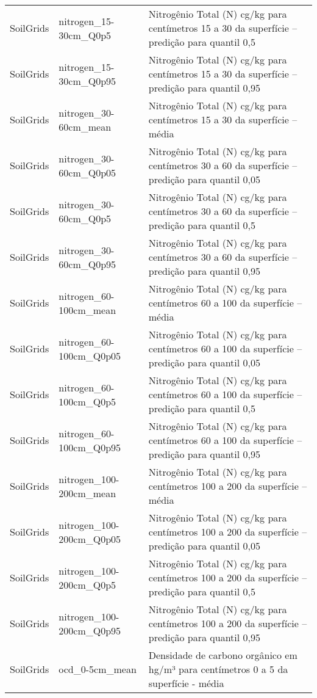 \begin{longtable}{@{} p{4cm} p{4cm} p{8cm} @{}}
	SoilGrids &
	nitrogen\_15-30cm\_Q0p5 &
	Nitrogênio Total (N) cg/kg  para centímetros 15 a 30 da superfície – predição para quantil 0,5 \\
	SoilGrids &
	nitrogen\_15-30cm\_Q0p95 &
	Nitrogênio Total (N) cg/kg  para centímetros 15 a 30 da superfície – predição para quantil 0,95 \\
	SoilGrids &
	nitrogen\_30-60cm\_mean &
	Nitrogênio Total (N) cg/kg  para centímetros 15 a 30 da superfície – média \\
	SoilGrids &
	nitrogen\_30-60cm\_Q0p05 &
	Nitrogênio Total (N) cg/kg  para centímetros 30 a 60 da superfície – predição para quantil 0,05 \\
	SoilGrids &
	nitrogen\_30-60cm\_Q0p5 &
	Nitrogênio Total (N) cg/kg  para centímetros 30 a 60 da superfície – predição para quantil 0,5 \\
	SoilGrids &
	nitrogen\_30-60cm\_Q0p95 &
	Nitrogênio Total (N) cg/kg  para centímetros 30 a 60 da superfície – predição para quantil 0,95 \\
	SoilGrids &
	nitrogen\_60-100cm\_mean &
	Nitrogênio Total (N) cg/kg  para centímetros 60 a 100 da superfície – média \\
	SoilGrids &
	nitrogen\_60-100cm\_Q0p05 &
	Nitrogênio Total (N) cg/kg  para centímetros 60 a 100 da superfície – predição para quantil 0,05 \\
	SoilGrids &
	nitrogen\_60-100cm\_Q0p5 &
	Nitrogênio Total (N) cg/kg  para centímetros 60 a 100 da superfície – predição para quantil 0,5 \\
	SoilGrids &
	nitrogen\_60-100cm\_Q0p95 &
	Nitrogênio Total (N) cg/kg  para centímetros 60 a 100 da superfície – predição para quantil 0,95 \\
	SoilGrids &
	nitrogen\_100-200cm\_mean &
	Nitrogênio Total (N) cg/kg  para centímetros 100 a 200 da superfície – média \\
	SoilGrids &
	nitrogen\_100-200cm\_Q0p05 &
	Nitrogênio Total (N) cg/kg  para centímetros 100 a 200 da superfície – predição para quantil 0,05 \\
	SoilGrids &
	nitrogen\_100-200cm\_Q0p5 &
	Nitrogênio Total (N) cg/kg  para centímetros 100 a 200 da superfície – predição para quantil 0,5 \\
	SoilGrids &
	nitrogen\_100-200cm\_Q0p95 &
	Nitrogênio Total (N) cg/kg  para centímetros 100 a 200 da superfície – predição para quantil 0,95 \\
	SoilGrids &
	ocd\_0-5cm\_mean &
	Densidade de carbono orgânico em hg/m³ para centímetros 0 a 5 da superfície - média \\

\end{longtable}
